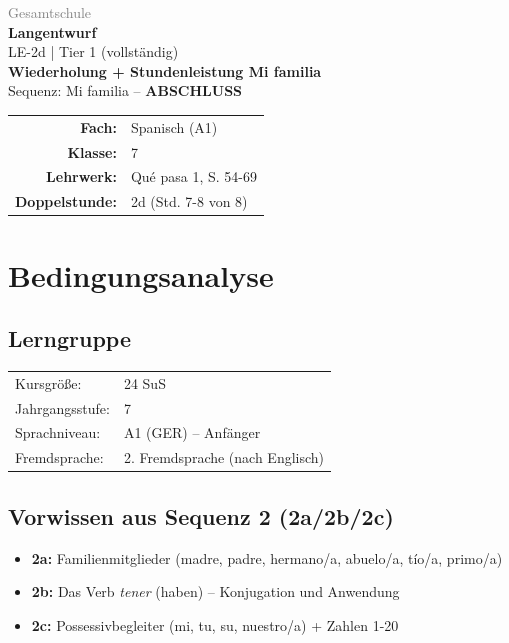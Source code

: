 \documentclass[11pt,a4paper]{article}
\newcommand{\fach}{Spanisch}
\newcommand{\jahrgangsstufe}{7}
\newcommand{\schulart}{Gesamtschule}
\newcommand{\stundenthema}{Wiederholung + Stundenleistung Mi familia}
\newcommand{\reihenthema}{Mi familia}
\newcommand{\stundennummer}{2d}
\newcommand{\lehrwerk}{Qué pasa 1}
\newcommand{\lehrwerkseite}{S. 54-69}
\newcommand{\lerngruppengroesse}{24}
\begin{document}
\begin{titlepage}
    \centering
    \vspace*{2cm}
    {\large\textcolor{gray}{\schulart}}\\[2cm]
    {\Huge\textcolor{fach}{\textbf{Langentwurf}}}\\[0.5cm]
    {\large LE-\stundennummer{} | Tier 1 (vollständig)}\\[2cm]
    {\LARGE\textbf{\stundenthema}}\\[0.5cm]
    {\large Sequenz: \reihenthema{} -- \textbf{ABSCHLUSS}}\\[2cm]
    \begin{tabular}{rl}
        \textbf{Fach:} & \fach{} (A1) \\[0.3cm]
        \textbf{Klasse:} & \jahrgangsstufe \\[0.3cm]
        \textbf{Lehrwerk:} & \lehrwerk, \lehrwerkseite \\[0.3cm]
        \textbf{Doppelstunde:} & \stundennummer{} (Std. 7-8 von 8) \\[0.3cm]
    \end{tabular}
    \vfill
\end{titlepage}

\tableofcontents
\newpage

\section{Bedingungsanalyse}

\subsection{Lerngruppe}
\begin{tabular}{ll}
    Kursgröße: & \lerngruppengroesse{} SuS \\
    Jahrgangsstufe: & \jahrgangsstufe \\
    Sprachniveau: & A1 (GER) -- Anfänger \\
    Fremdsprache: & 2. Fremdsprache (nach Englisch) \\
\end{tabular}

\subsection{Vorwissen aus Sequenz 2 (2a/2b/2c)}
\begin{itemize}
    \item \textbf{2a:} Familienmitglieder (madre, padre, hermano/a, abuelo/a, tío/a, primo/a)
    \item \textbf{2b:} Das Verb \textit{tener} (haben) -- Konjugation und Anwendung
    \item \textbf{2c:} Possessivbegleiter (mi, tu, su, nuestro/a) + Zahlen 1-20
\end{itemize}
\end{document}

